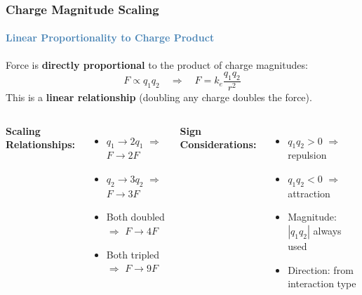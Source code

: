 \begin{frame}
\frametitle{\textsf{\textbf{Charge Magnitude Scaling}}}
\framesubtitle{\textcolor{steelblue}{Linear Proportionality to Charge Product}}

\vspace{-0.05cm}

\begin{keybox}
\vspace{0.1cm}
Force is \textbf{directly proportional} to the product of charge magnitudes:
\begin{equation*}
F \propto q_1 q_2 \quad \Rightarrow \quad F = k_e \frac{q_1 q_2}{r^2}
\end{equation*}
This is a \textbf{linear relationship} (doubling any charge doubles the force).
\end{keybox}

\vspace{0.3cm}

\begin{examplebox}
\vspace{0.15cm}
\begin{columns}[T]
    \textbf{Scaling Relationships:}
    \begin{itemize}
        \item $q_1 \rightarrow 2q_1$ $\Rightarrow$ $F \rightarrow 2F$
        \item $q_2 \rightarrow 3q_2$ $\Rightarrow$ $F \rightarrow 3F$
        \item Both doubled $\Rightarrow$ $F \rightarrow 4F$
        \item Both tripled $\Rightarrow$ $F \rightarrow 9F$
    \end{itemize}
    
    \textbf{Sign Considerations:}
    \begin{itemize}
        \item $q_1 q_2 > 0$ $\Rightarrow$ repulsion
        \item $q_1 q_2 < 0$ $\Rightarrow$ attraction
        \item Magnitude: $|q_1 q_2|$ always used
        \item Direction: from interaction type
    \end{itemize}
\end{columns}
\end{examplebox}


\end{frame}
